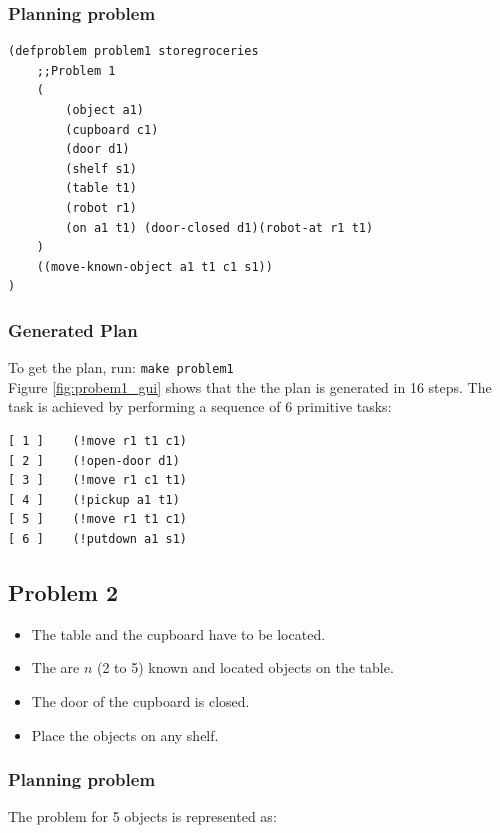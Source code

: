 \documentclass[paper=a4, fontsize=11pt]{scrartcl}
\begin{document}
	\newpage
	
	\subsubsection*{Planning problem}
	
	\begin{lstlisting}
(defproblem problem1 storegroceries
	;;Problem 1
	(
		(object a1)
		(cupboard c1)
		(door d1)
		(shelf s1)
		(table t1)
		(robot r1)
		(on a1 t1) (door-closed d1)(robot-at r1 t1)
	)
	((move-known-object a1 t1 c1 s1))
)
	\end{lstlisting}
	
	\subsubsection*{Generated Plan}
	
	To get the plan, run: \verb|make problem1| \\
	
	Figure \ref{fig:probem1_gui} shows that the the plan is generated in 16 steps. The task is achieved by performing a sequence of 6 primitive tasks: \\
	
	\begin{lstlisting}
[ 1 ]    (!move r1 t1 c1)
[ 2 ]    (!open-door d1)
[ 3 ]    (!move r1 c1 t1)
[ 4 ]    (!pickup a1 t1)
[ 5 ]    (!move r1 t1 c1)
[ 6 ]    (!putdown a1 s1)
	\end{lstlisting}
	
	\subsection{Problem 2}
	
	\begin{itemize}
		\item The table and the cupboard have to be located.
		\item The are $n$ (2 to 5) known and located objects on the table.
		\item The door of the cupboard is closed.
		\item Place the objects on any shelf.
	\end{itemize}
	
	\subsubsection*{Planning problem}
	
	The problem for 5 objects is represented as: \\
	
\end{document}
